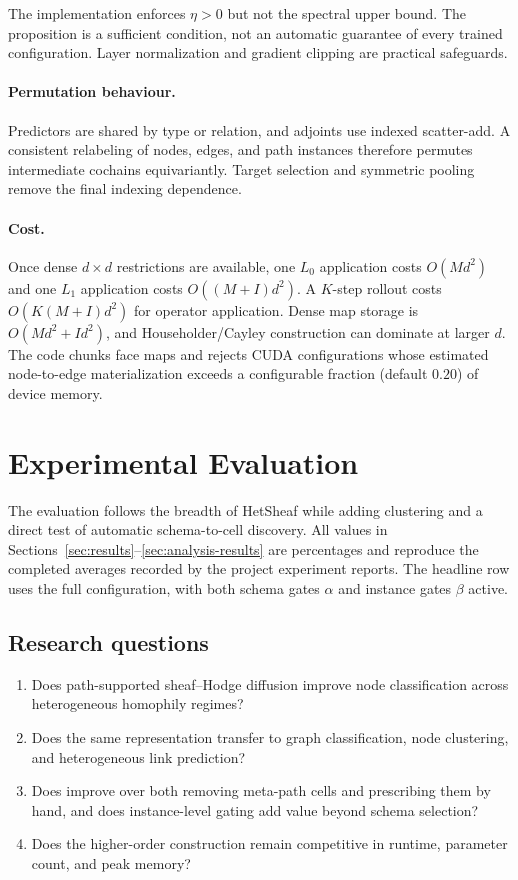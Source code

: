 The implementation enforces $\eta>0$ but not the spectral upper bound. The proposition is a
sufficient condition, not an automatic guarantee of every trained configuration. Layer
normalization and gradient clipping are practical safeguards.

\paragraph{Permutation behaviour.}
Predictors are shared by type or relation, and adjoints use indexed scatter-add. A consistent
relabeling of nodes, edges, and path instances therefore permutes intermediate cochains
equivariantly. Target selection and symmetric pooling remove the final indexing dependence.

\paragraph{Cost.}
Once dense $d\times d$ restrictions are available, one $L_0$ application costs $O(Md^2)$ and one
$L_1$ application costs $O((M+I)d^2)$. A $K$-step rollout costs $O(K(M+I)d^2)$ for operator
application. Dense map storage is $O(Md^2+Id^2)$, and Householder/Cayley construction can dominate
at larger $d$. The code chunks face maps and rejects CUDA configurations whose estimated
node-to-edge materialization exceeds a configurable fraction (default $0.20$) of device memory.

\section{Experimental Evaluation}
\label{sec:experiments}

The evaluation follows the breadth of HetSheaf \cite{braithwaite2024hetsheaf} while adding
clustering and a direct test of automatic schema-to-cell discovery. All values in
Sections~\ref{sec:results}--\ref{sec:analysis-results} are percentages and reproduce the completed
averages recorded by the project experiment reports. The headline \method{} row uses the full
\ampss{} configuration, with both schema gates $\alpha$ and instance gates $\beta$ active.

\subsection{Research questions}
\begin{enumerate}
  \item[RQ1.] Does path-supported sheaf--Hodge diffusion improve node classification across
  heterogeneous homophily regimes?
  \item[RQ2.] Does the same representation transfer to graph classification, node clustering, and
  heterogeneous link prediction?
  \item[RQ3.] Does \ampss{} improve over both removing meta-path cells and prescribing them by hand,
  and does instance-level gating add value beyond schema selection?
  \item[RQ4.] Does the higher-order construction remain competitive in runtime, parameter count, and
  peak memory?
\end{enumerate}

